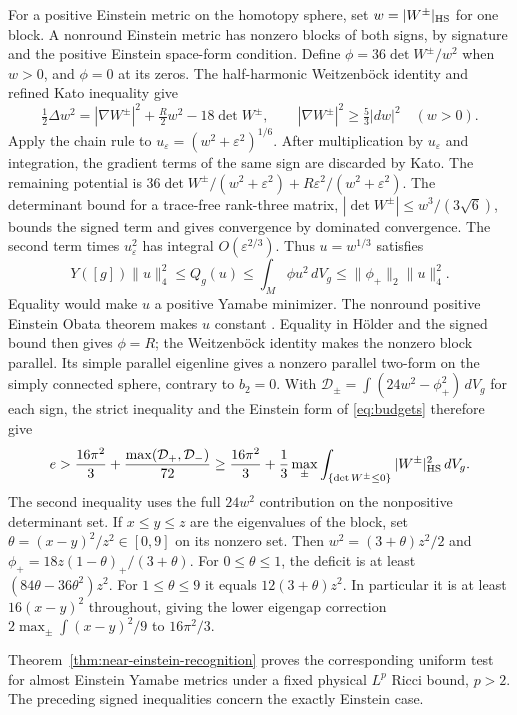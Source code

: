 \documentclass[11pt,letterpaper]{article}
\numberwithin{equation}{section}
\theoremstyle{remark}
\begin{document}
For a positive Einstein metric on the homotopy sphere, set
\(w=|W^\pm|_{\rm HS}\) for one block. A nonround Einstein metric
has nonzero blocks of both signs, by signature and the
positive Einstein space-form condition. Define
\(\phi=36\det W^\pm/w^2\) when \(w>0\), and \(\phi=0\) at its
zeros. The half-harmonic Weitzenb\"ock identity and refined
Kato inequality \cite[\S3]{GurskyMcKeownTyrrell2026} give
\[
 \tfrac12\Delta w^2=|\nabla W^\pm|^2+\tfrac R2w^2-18\det W^\pm,
 \qquad |\nabla W^\pm|^2\ge\tfrac53|dw|^2
 \quad(w>0).
\]
Apply the chain rule to \(u_\varepsilon=(w^2+\varepsilon^2)^{1/6}\).
After multiplication by \(u_\varepsilon\) and integration, the
gradient terms of the same sign are discarded by Kato. The
remaining potential is
\(36\det W^\pm/(w^2+\varepsilon^2)+R\varepsilon^2/(w^2+\varepsilon^2)\).
The determinant bound for a trace-free rank-three matrix,
\(|\det W^\pm|\le w^3/(3\sqrt6)\), bounds the signed term and
gives convergence by dominated convergence. The second term
times \(u_\varepsilon^2\) has integral \(O(\varepsilon^{2/3})\).
Thus \(u=w^{1/3}\) satisfies
\[
  Y([g])\|u\|_4^2\le Q_g(u)
  \le\int_M\phi u^2\,dV_g\le\|\phi_+\|_2\|u\|_4^2 .
\]
Equality would make \(u\) a positive Yamabe minimizer. The
nonround positive Einstein Obata theorem makes \(u\) constant
\cite{Obata1962Sphere,AkutagawaEndoSeshadri2019Gap}.
Equality in H\"older and the signed bound then gives
\(\phi=R\); the Weitzenb\"ock identity makes the nonzero block
parallel. Its simple parallel eigenline gives a nonzero parallel
two-form on the simply connected sphere, contrary to \(b_2=0\).
With \(\mathcal D_\pm=\int(24 w^2-\phi_+^2)\,dV_g\) for each sign,
the strict inequality and the Einstein form of \eqref{eq:budgets}
therefore give
\[
 e>\frac{16\pi^2}{3}+\frac{\max(\mathcal D_+,\mathcal D_-)}{72}
 \ge\frac{16\pi^2}{3}
   +\frac13\max_\pm\int_{\{\det W^\pm\le0\}}
                      |W^\pm|_{\rm HS}^2\,dV_g .
\]
The second inequality uses the full \(24w^2\) contribution on
the nonpositive determinant set.
If \(x\le y\le z\) are the eigenvalues of the block, set
\(\theta=(x-y)^2/z^2\in[0,9]\) on its nonzero set.
Then \(w^2=(3+\theta)z^2/2\) and
\(\phi_+=18 z(1-\theta)_+/(3+\theta)\).
For \(0\le\theta\le1\), the deficit is at least
\((84\theta-36\theta^2)z^2\). For \(1\le\theta\le9\) it
equals \(12(3+\theta)z^2\). In particular it is at least
\(16(x-y)^2\) throughout, giving the lower eigengap
correction \(2\max_\pm\int(x-y)^2/9\) to \(16\pi^2/3\).

Theorem~\ref{thm:near-einstein-recognition} proves the corresponding
uniform test for almost Einstein Yamabe metrics under a fixed physical
\(L^p\) Ricci bound, \(p>2\). The preceding signed inequalities concern
the exactly Einstein case.
\end{document}
